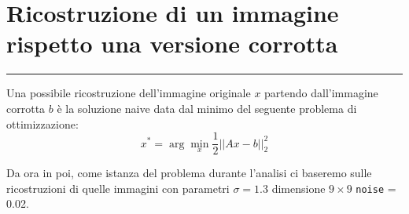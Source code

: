 {\color{oorange}\section{Ricostruzione di un immagine rispetto una versione corrotta}}
\textcolor{oorange}{\rule[5pt]{\textwidth}{1pt}}
Una possibile ricostruzione dell'immagine originale $x$ partendo dall'immagine corrotta $b$ è la soluzione naive 
data dal minimo del seguente problema di ottimizzazione:
\[x^* = \arg\min_x \frac{1}{2} ||Ax - b||_2^2\]

Da ora in poi, come istanza del problema durante l'analisi ci baseremo sulle ricostruzioni di
 quelle immagini con parametri
$\sigma = 1.3$ dimensione $9\times 9$ \verb|noise| = 0.02.

